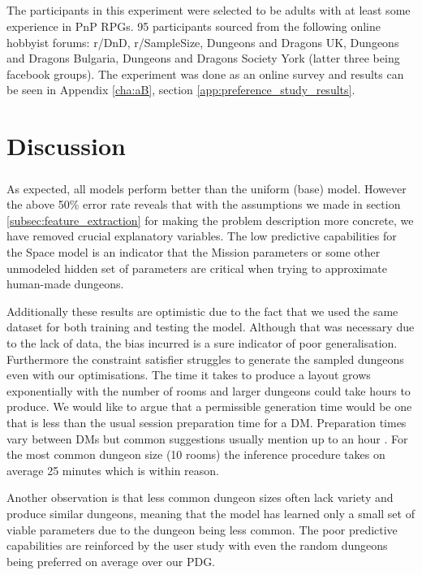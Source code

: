 \documentclass{UoYCSproject}
\begin{document}
\paragraph{}
The participants in this experiment were selected to be adults with at least some experience in PnP RPGs. 95 participants sourced from the following online hobbyist forums: r/DnD, r/SampleSize, Dungeons and Dragons UK, Dungeons and Dragons Bulgaria, Dungeons and Dragons Society York (latter three being facebook groups). The experiment was done as an online survey and results can be seen in Appendix \ref{cha:aB}, section \ref{app:preference_study_results}.


\chapter{Discussion}
\paragraph{}
As expected, all models perform better than the uniform (base) model. However the above 50\% error rate reveals that with the assumptions we made in section \ref{subsec:feature_extraction} for making the problem description more concrete, we have removed crucial explanatory variables. The low predictive capabilities for the Space model is an indicator that the Mission parameters or some other unmodeled hidden set of parameters are critical when trying to approximate human-made dungeons. 

Additionally these results are optimistic due to the fact that we used the same dataset for both training and testing the model. Although that was necessary due to the lack of data, the bias incurred is a sure indicator of poor generalisation. Furthermore the constraint satisfier struggles to generate the sampled dungeons even with our optimisations. The time it takes to produce a layout grows exponentially with the number of rooms and larger dungeons could take hours to produce. We would like to argue that a permissible generation time would be one that is less than the usual session preparation time for a DM. Preparation times vary between DMs but common suggestions usually mention up to an hour \parencite{SessionPrepTime}. For the most common dungeon size (10 rooms) the inference procedure takes on average 25 minutes which is within reason. 

Another observation is that less common dungeon sizes often lack variety and produce similar dungeons, meaning that the model has learned only a small set of viable parameters due to the dungeon being less common.
The poor predictive capabilities are reinforced by the user study with even the random dungeons being preferred on average over our PDG.
\end{document}
